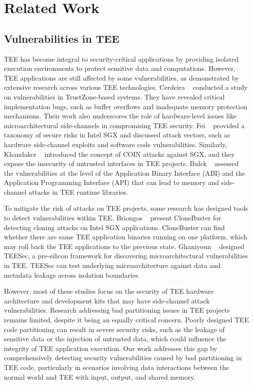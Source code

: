 \section{Related Work} \label{s:related}
\subsection{Vulnerabilities in TEE}
TEE has become integral to security-critical applications by providing isolated execution environments to protect sensitive data and computations. However, TEE applications are still affected by some vulnerabilities, as demonstrated by extensive research across various TEE technologies.
Cerdeira \etal~\cite{9152801} conducted a study on vulnerabilities in TrustZone-based systems. They have revealed critical implementation bugs, such as buffer overflows and inadequate memory protection mechanisms. Their work also underscores the role of hardware-level issues like microarchitectural side-channels in compromising TEE security.
Fei \etal~\cite{10.1145/3456631} provided a taxonomy of secure risks in Intel SGX and discussed attack vectors, such as hardware side-channel exploits and software code vulnerabilities.
Similarly, Khandaker \etal~\cite{10.1145/3373376.3378486} introduced the concept of COIN attacks against SGX, and they expose the insecurity of untrusted interfaces in TEE projects.
Bulck \etal~\cite{10.1145/3319535.3363206} assessed the vulnerabilities at the level of the Application Binary Interface (ABI) and the Application Programming Interface (API) that can lead to memory and side-channel attacks in TEE runtime libraries.

To mitigate the risk of attacks on TEE projects, some research has designed tools to detect vulnerabilities within TEE.
Briongos \etal~\cite{10.1145/3627106.3627187} present CloneBuster for detecting cloning attacks on Intel SGX applications. CloneBuster can find whether there are same TEE application binaries running on one platform, which may roll back the TEE applications to the previous state. 
Ghaniyoun \etal~\cite{10.1145/3579371.3589070} designed TEESec, a pre-silicon framework for discovering microarchitectural vulnerabilities in TEE. TEESec can test underlying microarchitecture against data and metadata leakage across isolation boundaries.

However, most of these studies focus on the security of TEE hardware architecture and development kits that may have side-channel attack vulnerabilities. Research addressing bad partitioning issues in TEE projects remains limited, despite it being an equally critical concern.
Poorly designed TEE code partitioning can result in severe security risks, such as the leakage of sensitive data or the injection of untrusted data, which could influence the integrity of TEE application execution.
Our work addresses this gap by comprehensively detecting security vulnerabilities caused by bad partitioning in TEE code, particularly in scenarios involving data interactions between the normal world and TEE with input, output, and shared memory. 

